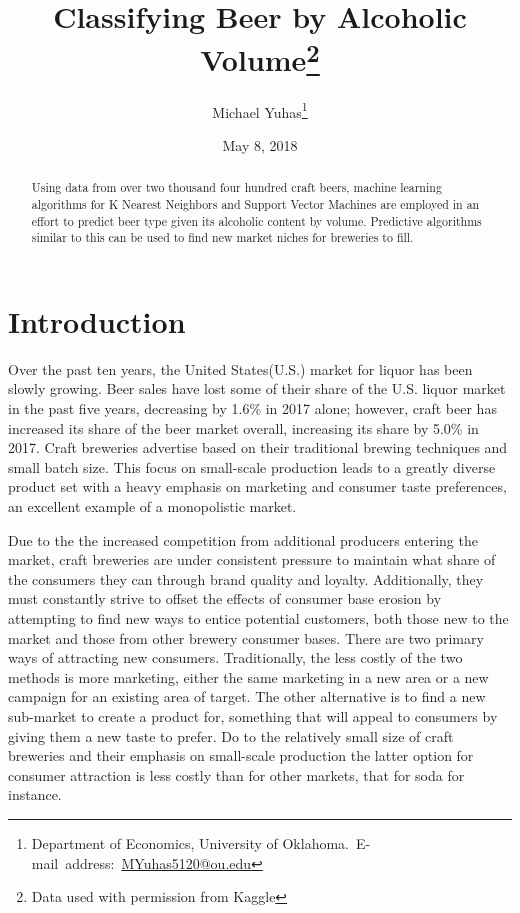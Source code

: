\documentclass[12pt,english]{article}
\begin{document}
\begin{singlespace}
\title{Classifying Beer by Alcoholic Volume\thanks{Data used with permission from Kaggle}}
\end{singlespace}

\author{Michael Yuhas\thanks{Department of Economics, University of Oklahoma.\
E-mail~address:~\href{mailto:MYuhas5120@ou.edu}{MYuhas5120@ou.edu}}}

\date{May 8, 2018}

\maketitle

\begin{abstract}
\begin{singlespace}
Using data from over two thousand four hundred craft beers, machine learning algorithms for K Nearest Neighbors and Support Vector Machines are employed in an effort to predict beer type given its alcoholic content by volume.  Predictive algorithms similar to this can be used to find new market niches for breweries to fill.
\end{singlespace}

\end{abstract}
\vfill{}


\pagebreak{}


\section{Introduction}\label{sec:intro}
Over the past ten years, the United States(U.S.) market for liquor has been slowly growing.  Beer sales have lost some of their share of the U.S. liquor market in the past five years, decreasing by 1.6\% in 2017 alone; however, craft beer has increased its share of the beer market overall, increasing its share by 5.0\%  in 2017\citep{BrewersFriend2}.  Craft breweries advertise based on their traditional brewing techniques and small batch size.  This focus on small-scale production leads to a greatly diverse product set with a heavy emphasis on marketing and consumer taste preferences, an excellent example of a monopolistic market.

Due to the the increased competition from additional producers entering the market, craft breweries are under consistent pressure to maintain what share of the consumers they can through brand quality and loyalty.  Additionally, they must constantly strive to offset the effects of consumer base erosion by attempting to find new ways to entice potential customers, both those new to the market and those from other brewery consumer bases.  There are two primary ways of attracting new consumers.  Traditionally, the less costly of the two methods is more marketing, either the same marketing in a new area or a new campaign for an existing area of target.  The other alternative is to find a new sub-market to create a product for, something that will appeal to consumers by giving them a new taste to prefer.  Do to the relatively small size of craft breweries and their emphasis on small-scale production the latter option for consumer attraction is less costly than for other markets, that for soda for instance.
\end{document}
